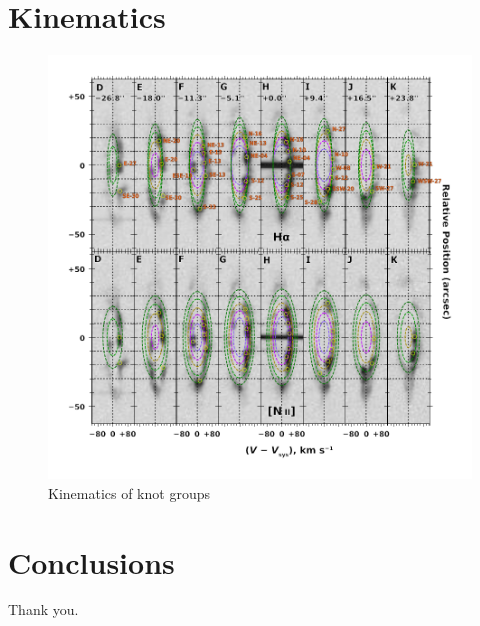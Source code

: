 \documentclass[twocolumn, times]{aastex631}
\begin{document}
\section{Kinematics}
\label{sec:kinematics}

\begin{figure}
  \centering
  \includegraphics[width=\linewidth]{figs/zavala-slit-spectra-select-annotated}
  \caption{Kinematics of knot groups}
  \label{fig:longslit-spectra}
\end{figure}

\section{Conclusions}
\label{sec:conclusions}

\begin{acknowledgments}
  Thank you.
\end{acknowledgments}



\end{document}
